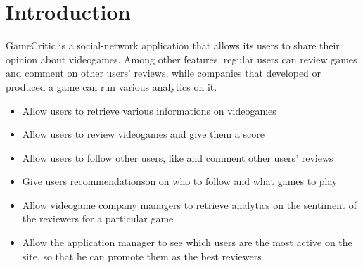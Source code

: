 \chapter{Introduction}
GameCritic is a social-network application that allows its users to share their opinion about videogames.
Among other features, regular users can review games and comment on other users' reviews, while companies that developed or produced
a game can run various analytics on it.
\begin{itemize}
	\item Allow users to retrieve various informations on videogames
	\item Allow users to review videogames and give them a score 
	\item Allow users to follow other users, like and comment other users' reviews
	\item Give users recommendationson on who to follow and what games to play
	\item Allow videogame company managers to retrieve analytics on the sentiment of the reviewers for a particular game 
	\item Allow the application manager to see which users are the most active on the site, so that he can promote them as the best reviewers 
\end{itemize}
